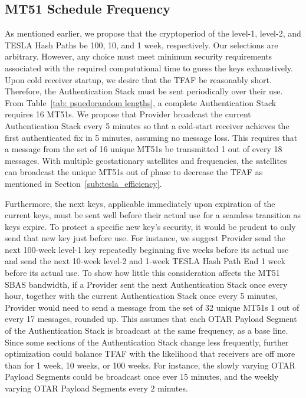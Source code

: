 \documentclass[letterpaper,times]{IONconf/IONconf}
\begin{document}
	\subsection{MT51 Schedule Frequency} \label{sub:mt51_schedule_frequency}

		As mentioned earlier, we propose that the cryptoperiod of the level-1, level-2, and TESLA Hash Paths be 100, 10, and 1 week, respectively.
		Our selections are arbitrary.
		However,  any choice must meet minimum security requirements associated with the required computational time to guess the keys exhaustively.
		Upon cold receiver startup, we desire that the TFAF be reasonably short.
		Therefore, the Authentication Stack must be sent periodically over their use.
		From Table~\ref{tab: psuedorandom lengths}, a complete Authentication Stack requires 16 MT51s. 
		We propose that Provider broadcast the current Authentication Stack every 5 minutes so that a cold-start receiver achieves the first authenticated fix in 5 minutes, assuming no message loss.
		This requires that a message from the set of 16 unique MT51s be transmitted 1 out of every 18 messages.
		With multiple geostationary satellites and frequencies, the satellites can broadcast the unique MT51s out of phase to decrease the TFAF as mentioned in Section~\ref{sub:tesla_efficiency}.

		Furthermore, the next keys, applicable immediately upon expiration of the current keys, must be sent well before their actual use for a seamless transition as keys expire.
		To protect a specific new key's security, it would be prudent to only send that new key just before use.
		For instance, we suggest Provider send the next 100-week level-1 key repeatedly beginning five weeks before its actual use and send the next 10-week level-2 and 1-week TESLA Hash Path End 1 week before its actual use.
		To show how little this consideration affects the MT51 SBAS bandwidth, if a Provider sent the next Authentication Stack once every hour, together with the current Authentication Stack once every 5 minutes, Provider would need to send a message from the set of 32 unique MT51s 1 out of every 17 messages, rounded up.
		This assumes that each OTAR Payload Segment of the Authentication Stack is broadcast at the same frequency, as a base line.
		Since some sections of the Authentication Stack change less frequently, further optimization could balance TFAF with the likelihood that receivers are off more than for 1 week, 10 weeks, or 100 weeks.
		For instance, the slowly varying OTAR Payload Segments could be broadcast once ever 15 minutes, and the weekly varying OTAR Payload Segments every 2 minutes.
\end{document}
